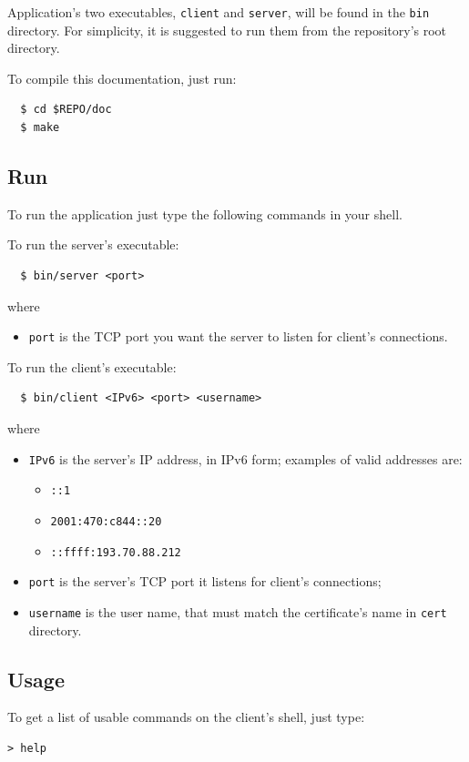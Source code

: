 \documentclass[a4paper,12pt]{article}
\begin{document}
Application's two executables, \texttt{client} and \texttt{server}, will be found in the \texttt{bin} directory.
For simplicity, it is suggested to run them from the repository's root directory.

To compile this documentation, just run:
\begin{verbatim}
  $ cd $REPO/doc
  $ make
\end{verbatim}

\subsection{Run}
To run the application just type the following commands in your shell.

To run the server's executable:
\begin{verbatim}
  $ bin/server <port>
\end{verbatim}
where
\begin{itemize}
  \item \texttt{port} is the TCP port you want the server to listen for client's connections.
\end{itemize}

To run the client's executable:
\begin{verbatim}
  $ bin/client <IPv6> <port> <username>
\end{verbatim}
where
\begin{itemize}
  \item \texttt{IPv6} is the server's IP address, in IPv6 form; examples of valid addresses are:
  \begin{itemize}
    \item \texttt{::1}
    \item \texttt{2001:470:c844::20}
    \item \texttt{::ffff:193.70.88.212}
  \end{itemize}
  \item \texttt{port} is the server's TCP port it listens for client's connections;
  \item \texttt{username} is the user name, that must match the certificate's name in \texttt{cert} directory.
\end{itemize}

\subsection{Usage}
To get a list of usable commands on the client's shell, just type:
\begin{verbatim}
> help
\end{verbatim}
\end{document}
